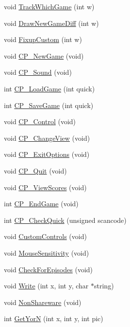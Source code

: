 \begin{DoxyCompactItemize}
void \hyperlink{WL__MENU_8H_ad95aadf50d120f80e53480d55e7a1824}{TrackWhichGame} (int w)
\item 
void \hyperlink{WL__MENU_8H_aafd1b4c9e4950fe29a16710ad71376d5}{DrawNewGameDiff} (int w)
\item 
void \hyperlink{WL__MENU_8H_a7754ea2238d7a0c2711434bbc6b56379}{FixupCustom} (int w)
\item 
void \hyperlink{WL__MENU_8H_a8f189c2d0971b91261fe50e58bc4b64a}{CP\_\-NewGame} (void)
\item 
void \hyperlink{WL__MENU_8H_a33c03c428f4fe132d1e5006416422ed4}{CP\_\-Sound} (void)
\item 
int \hyperlink{WL__MENU_8H_a2ca12f5b43c80ee49b36a78621ac8ce4}{CP\_\-LoadGame} (int quick)
\item 
int \hyperlink{WL__MENU_8H_a62fb7c17655ed1e0031cbeafd182ee31}{CP\_\-SaveGame} (int quick)
\item 
void \hyperlink{WL__MENU_8H_a8d89e45be2c67ed682acb9ee0c09cd75}{CP\_\-Control} (void)
\item 
void \hyperlink{WL__MENU_8H_a95a4685a2d017477e6a863344b787642}{CP\_\-ChangeView} (void)
\item 
void \hyperlink{WL__MENU_8H_aaca709d19705758fef8027de66d132d4}{CP\_\-ExitOptions} (void)
\item 
void \hyperlink{WL__MENU_8H_ad29825b90b8a92ca853643f18f868705}{CP\_\-Quit} (void)
\item 
void \hyperlink{WL__MENU_8H_a5d2d9c59773600f8b810e6f8a715a21f}{CP\_\-ViewScores} (void)
\item 
int \hyperlink{WL__MENU_8H_a36185687b73d760059be35f2c35aaad1}{CP\_\-EndGame} (void)
\item 
int \hyperlink{WL__MENU_8H_a95a8089ef599aecc8a81f90ba35032dd}{CP\_\-CheckQuick} (unsigned scancode)
\item 
void \hyperlink{WL__MENU_8H_a0631548359f161b2a227317582c6c4a6}{CustomControls} (void)
\item 
void \hyperlink{WL__MENU_8H_a8a190d4f3b624a81b86aa5c75d1bd4d1}{MouseSensitivity} (void)
\item 
void \hyperlink{WL__MENU_8H_ad57118b3592a6be117bc85d1418bb6b9}{CheckForEpisodes} (void)
\item 
void \hyperlink{WL__MENU_8H_a2a840b71aa584f6332da78f4eeec8767}{Write} (int x, int y, char $\ast$string)
\item 
void \hyperlink{WL__MENU_8H_aa6b18519250a34e966e6900c6328008b}{NonShareware} (void)
\item 
int \hyperlink{WL__MENU_8H_ab99c9ad73f67e91963071c21c3694637}{GetYorN} (int x, int y, int pic)
\end{DoxyCompactItemize}
